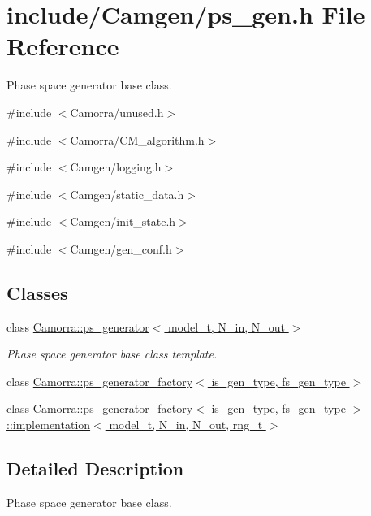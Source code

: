 \hypertarget{a00614}{
\section{include/Camgen/ps\_\-gen.h File Reference}
\label{a00614}
}


Phase space generator base class.  


{\ttfamily \#include $<$Camorra/unused.h$>$}\par
{\ttfamily \#include $<$Camorra/CM\_\-algorithm.h$>$}\par
{\ttfamily \#include $<$Camgen/logging.h$>$}\par
{\ttfamily \#include $<$Camgen/static\_\-data.h$>$}\par
{\ttfamily \#include $<$Camgen/init\_\-state.h$>$}\par
{\ttfamily \#include $<$Camgen/gen\_\-conf.h$>$}\par
\subsection*{Classes}
\begin{DoxyCompactItemize}
\item 
class \hyperlink{a00432}{Camorra::ps\_\-generator$<$ model\_\-t, N\_\-in, N\_\-out $>$}
\begin{DoxyCompactList}\small\item\em Phase space generator base class template. \end{DoxyCompactList}\item 
class \hyperlink{a00434}{Camorra::ps\_\-generator\_\-factory$<$ is\_\-gen\_\-type, fs\_\-gen\_\-type $>$}
\item 
class \hyperlink{a00295}{Camorra::ps\_\-generator\_\-factory$<$ is\_\-gen\_\-type, fs\_\-gen\_\-type $>$::implementation$<$ model\_\-t, N\_\-in, N\_\-out, rng\_\-t $>$}
\end{DoxyCompactItemize}


\subsection{Detailed Description}
Phase space generator base class. 